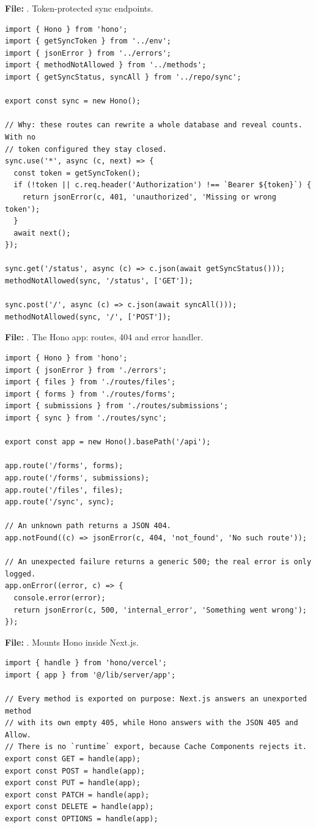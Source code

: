\documentclass[11pt,a4paper]{article}
\begin{document}
\textbf{File:} . Token-protected sync endpoints.\par
\begin{lstlisting}
import { Hono } from 'hono';
import { getSyncToken } from '../env';
import { jsonError } from '../errors';
import { methodNotAllowed } from '../methods';
import { getSyncStatus, syncAll } from '../repo/sync';

export const sync = new Hono();

// Why: these routes can rewrite a whole database and reveal counts. With no
// token configured they stay closed.
sync.use('*', async (c, next) => {
  const token = getSyncToken();
  if (!token || c.req.header('Authorization') !== `Bearer ${token}`) {
    return jsonError(c, 401, 'unauthorized', 'Missing or wrong token');
  }
  await next();
});

sync.get('/status', async (c) => c.json(await getSyncStatus()));
methodNotAllowed(sync, '/status', ['GET']);

sync.post('/', async (c) => c.json(await syncAll()));
methodNotAllowed(sync, '/', ['POST']);
\end{lstlisting}

\textbf{File:} . The Hono app: routes, 404 and error handler.\par
\begin{lstlisting}
import { Hono } from 'hono';
import { jsonError } from './errors';
import { files } from './routes/files';
import { forms } from './routes/forms';
import { submissions } from './routes/submissions';
import { sync } from './routes/sync';

export const app = new Hono().basePath('/api');

app.route('/forms', forms);
app.route('/forms', submissions);
app.route('/files', files);
app.route('/sync', sync);

// An unknown path returns a JSON 404.
app.notFound((c) => jsonError(c, 404, 'not_found', 'No such route'));

// An unexpected failure returns a generic 500; the real error is only logged.
app.onError((error, c) => {
  console.error(error);
  return jsonError(c, 500, 'internal_error', 'Something went wrong');
});
\end{lstlisting}

\textbf{File:} . Mounts Hono inside Next.js.\par
\begin{lstlisting}
import { handle } from 'hono/vercel';
import { app } from '@/lib/server/app';

// Every method is exported on purpose: Next.js answers an unexported method
// with its own empty 405, while Hono answers with the JSON 405 and Allow.
// There is no `runtime` export, because Cache Components rejects it.
export const GET = handle(app);
export const POST = handle(app);
export const PUT = handle(app);
export const PATCH = handle(app);
export const DELETE = handle(app);
export const OPTIONS = handle(app);
\end{lstlisting}
\end{document}
